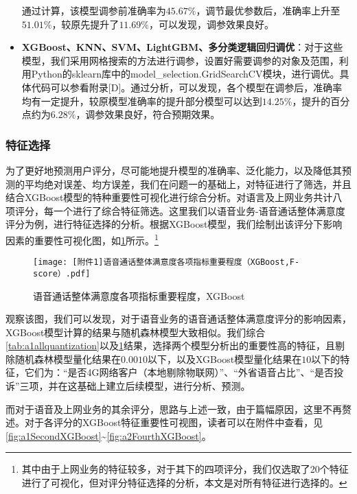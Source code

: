\documentclass{MathorCupmodeling}
\begin{document}
\begin{itemize}
		通过计算，该模型调参前准确率为$45.67\%$，调节最优参数后，准确率上升至$51.01\%$，较原先提升了$11.69\%$，可以发现，调参效果良好。
		\item \textbf{XGBoost、KNN、SVM、LightGBM、多分类逻辑回归调优}：对于这些模型，我们采用网格搜索的方法进行调参，设置好需要调参的对象及范围，利用Python的sklearn库中的model\_selection.GridSearchCV模块，进行调优。具体代码可以参看附录[D]。通过分析，可以发现，各个模型在调参后，准确率均有一定提升，较原模型准确率的提升部分模型可以达到$14.25\%$，提升的百分点约为$6.28\%$，调参效果良好，符合预期效果。
	\end{itemize}

	\subsubsection{特征选择}
	为了更好地预测用户评分，尽可能地提升模型的准确率、泛化能力，以及降低其预测的平均绝对误差、均方误差，我们在问题一的基础上，对特征进行了筛选，并且结合XGBoost模型的特种重要性可视化进行综合分析。对语言及上网业务共计八项评分，每一个进行了综合特征筛选。这里我们以语音业务-语音通话整体满意度评分为例，进行特征选择的分析。根据XGBoost模型，我们绘制出该评分下影响因素的重要性可视化图，如\textcolor{blue}{\cref{fig:a1FirstXGBoost}}所示。\textcolor{blue}{\footnote{其中由于上网业务的特征较多，对于其下的四项评分，我们仅选取了20个特征进行了可视化，但对评分特征选择的分析，本文是对所有特征进行选择的。}}
	\begin{figure}[htbp]
		\centerline{\texttt{[image: [附件1]语音通话整体满意度各项指标重要程度（XGBoost,F-score）.pdf]}}
		\caption{语音通话整体满意度各项指标重要程度，XGBoost}\label{fig:a1FirstXGBoost}
	\end{figure}

	观察该图，我们可以发现，对于语音业务的语音通话整体满意度评分的影响因素，XGBoost模型计算的结果与随机森林模型大致相似。我们综合\textcolor{blue}{\cref{tab:a1allquantization}}以及\textcolor{blue}{\cref{fig:a1FirstXGBoost}}结果，选择两个模型分析出的重要性高的特征，且剔除随机森林模型量化结果在$0.0010$以下，以及XGBoost模型量化结果在$10$以下的特征，它们为：“是否4G网络客户（本地剔除物联网）”、“外省语音占比”、“是否投诉”三项，并在这基础上建立后续模型，进行分析、预测。

	而对于语音及上网业务的其余评分，思路与上述一致，由于篇幅原因，这里不再赘述。对于各评分的XGBoost特征重要性可视图，读者可以在附件中查看，见\textcolor{blue}{\cref{fig:a1SecondXGBoost}}\textasciitilde\textcolor{blue}{\cref{fig:a2FourthXGBoost}}。
\end{document}
